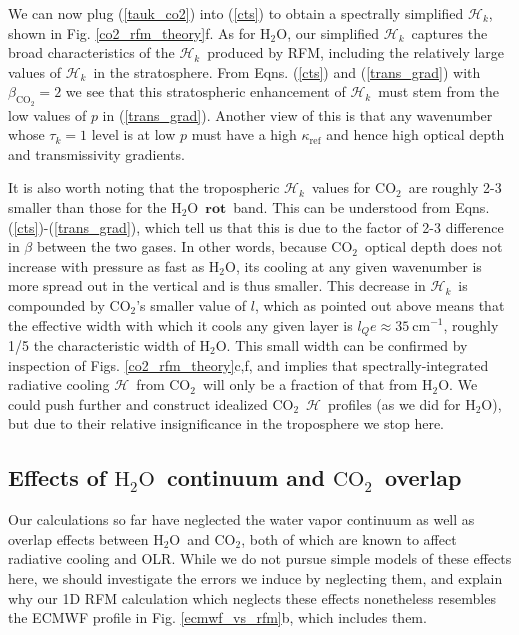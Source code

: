 \documentclass{ametsoc}
\newcommand{\eqnref}[1]{(\ref{#1})}
\newcommand{\cminverse}{\ensuremath{\mathrm{cm^{-1}}}}
\newcommand{\cotwo}{\ensuremath{\mathrm{CO_2}}}
\newcommand{\htwo}{\ensuremath{\mathrm{H_2O}}}
\newcommand{\ch}{\ensuremath{\mathcal{H}}}
\newcommand{\chk}{\ensuremath{\ch_k}}
\newcommand{\tauk}{\ensuremath{\tau_k}}
\newcommand{\kapparef}{\ensuremath{\kappa_{\mathrm{ref}}}}
\newcommand{\lQ}{\ensuremath{l_{Q}}}
\newcommand{\rot}{\ensuremath{\mathbf{rot}}}
\begin{document}
We can now plug \eqnref{tauk_co2} into \eqnref{cts} to obtain a spectrally simplified \chk, shown in Fig. \ref{co2_rfm_theory}f. As for \htwo, our simplified \chk\ captures the broad characteristics of the \chk\ produced by RFM, including the relatively large values of \chk\ in the stratosphere. From Eqns. \eqnref{cts} and \eqnref{trans_grad} with $\beta_{\cotwo}=2$  we see that this stratospheric enhancement of \chk\ must stem from the low values of $p$ in \eqnref{trans_grad}. Another view of this is that any wavenumber whose $\tauk=1$ level is at low $p$ must have a high $\kapparef$ and hence high optical depth and transmissivity gradients.

It is also worth noting that the tropospheric \chk\ values for \cotwo\ are roughly 2-3 smaller than those for the \htwo\ \rot\ band. 
This can be understood from Eqns. \eqnref{cts}-\eqnref{trans_grad}, which tell us that this is due to the factor of 2-3 difference in $\beta$ between the two gases. In other words, because \cotwo\ optical depth does not increase with pressure as fast as \htwo, its cooling at any given wavenumber is more spread out in the vertical and is thus smaller. This decrease in \chk\ is compounded by \cotwo's smaller value of $l$, which as pointed out above means that the effective width with which it cools any given layer is $\lQ e \approx 35 \ \cminverse$, roughly 1/5 the characteristic width of \htwo. This small width can be confirmed by inspection of Figs. \ref{co2_rfm_theory}c,f, and implies that spectrally-integrated radiative cooling \ch\ from \cotwo\ will only be a fraction of that from \htwo. We could push further and construct idealized \cotwo\ \ch\ profiles  (as we did for \htwo), but due to their relative insignificance in the troposphere we stop here. 

	
\subsection{Effects of \htwo\ continuum and \cotwo\ overlap} \label{sec_cont_co2}
Our calculations so far have neglected the water vapor continuum as well as overlap effects between \htwo\ and \cotwo, both of which are known to affect radiative cooling and OLR. While we do not pursue simple models of these effects here, we should investigate the errors we induce by neglecting them, and explain why our 1D RFM calculation which neglects these effects nonetheless resembles the ECMWF profile in Fig. \ref{ecmwf_vs_rfm}b, which includes them.
\end{document}
